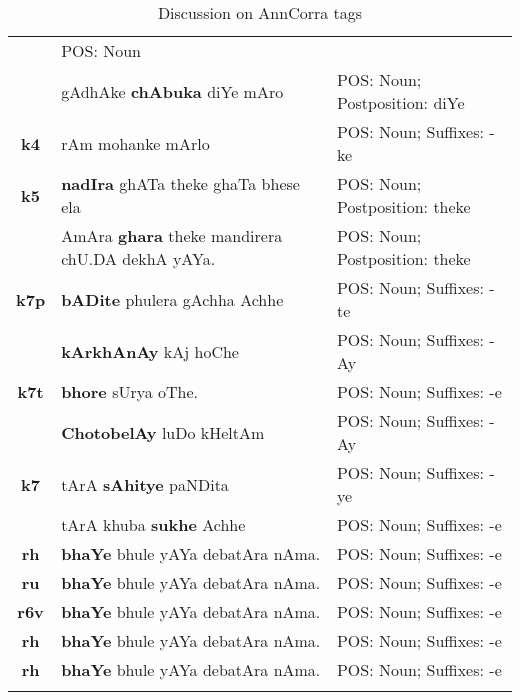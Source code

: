 \documentclass[a4 paper]{article}
\begin{document}
\begin{longtable}{cp{}p{}}
                 & POS: Noun\\
    \addlinespace[0.5em]
                 & gAdhAke \textbf{chAbuka} diYe mAro
                 & POS: Noun; Postposition: diYe\\
    \midrule
    \addlinespace[0.5em]
    \textbf{k4}
                 & rAm mohanke mArlo
                 & POS: Noun; Suffixes: -ke\\
    \midrule
    \addlinespace[0.5em]
    \textbf{k5}
                 & \textbf{nadIra} ghATa theke ghaTa bhese ela
                 & POS: Noun; Postposition: theke\\
    \addlinespace[0.5em]
                 & AmAra \textbf{ghara} theke mandirera chU.DA dekhA yAYa.
                 & POS: Noun; Postposition: theke\\
    \midrule
    \addlinespace[0.5em]
    \textbf{k7p}
                 & \textbf{bADite} phulera gAchha Achhe
                 & POS: Noun; Suffixes: -te\\
    \addlinespace[0.5em]
                 & \textbf{kArkhAnAy} kAj hoChe
                 & POS: Noun; Suffixes: -Ay\\
    \midrule
    \addlinespace[0.5em]
    \textbf{k7t}
                 & \textbf{bhore} sUrya oThe.
                 & POS: Noun; Suffixes: -e\\
    \addlinespace[0.5em]
                 & \textbf{ChotobelAy} luDo kHeltAm
                 & POS: Noun; Suffixes: -Ay\\
    \midrule
    \addlinespace[0.5em]
    \textbf{k7}
                 & tArA \textbf{sAhitye} paNDita
                 & POS: Noun; Suffixes: -ye\\
    \addlinespace[0.5em]
                 & tArA khuba \textbf{sukhe} Achhe
                 & POS: Noun; Suffixes: -e\\
    \midrule
    \addlinespace[0.5em]
    \textbf{rh}
                 & \textbf{bhaYe} bhule yAYa debatAra nAma.
                 & POS: Noun; Suffixes: -e\\
    \midrule
    \addlinespace[0.5em]
    \textbf{ru}
                 & \textbf{bhaYe} bhule yAYa debatAra nAma.
                 & POS: Noun; Suffixes: -e\\
    \midrule
    \addlinespace[0.5em]
    \textbf{r6v}
                 & \textbf{bhaYe} bhule yAYa debatAra nAma.
                 & POS: Noun; Suffixes: -e\\
    \midrule
    \addlinespace[0.5em]
    \textbf{rh}
                 & \textbf{bhaYe} bhule yAYa debatAra nAma.
                 & POS: Noun; Suffixes: -e\\
    \midrule
    \addlinespace[0.5em]
    \textbf{rh}
                 & \textbf{bhaYe} bhule yAYa debatAra nAma.
                 & POS: Noun; Suffixes: -e\\
    \midrule
\caption{Discussion on AnnCorra tags}
\label{tab:anncorratable}
\end{longtable}
\end{document}
